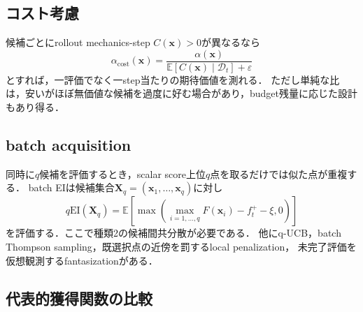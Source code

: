 \documentclass[a4paper,11pt]{ltjsarticle}
\newcommand{\E}{\mathbb E}
\newcommand{\D}{\mathcal D}
\begin{document}
\subsection{コスト考慮}

候補ごとにrollout mechanics-step \(C(\bm x)>0\)が異なるなら
\begin{equation}
  \alpha_{\mathrm{cost}}(\bm x)
  =\frac{\alpha(\bm x)}{\E[C(\bm x)\mid\D_t]+\varepsilon}
  \label{eq:cost-aware-acquisition}
\end{equation}
とすれば，一評価でなく一step当たりの期待価値を測れる．
ただし単純な比は，安いがほぼ無価値な候補を過度に好む場合があり，budget残量に応じた設計もあり得る．

\subsection{batch acquisition}

同時に\(q\)候補を評価するとき，scalar score上位\(q\)点を取るだけでは似た点が重複する．
batch EIは候補集合\(\bm X_q=(\bm x_1,\ldots,\bm x_q)\)に対し
\begin{equation}
  q\mathrm{EI}(\bm X_q)
  =\E\left[
  \max\left(\max_{i=1,\ldots,q}F(\bm x_i)-f_t^+-\xi,0\right)
  \right]
  \label{eq:qei}
\end{equation}
を評価する．ここで種類2の候補間共分散が必要である．
他にq-UCB，batch Thompson sampling，既選択点の近傍を罰するlocal penalization，
未完了評価を仮想観測するfantasizationがある．

\subsection{代表的獲得関数の比較}
\end{document}
